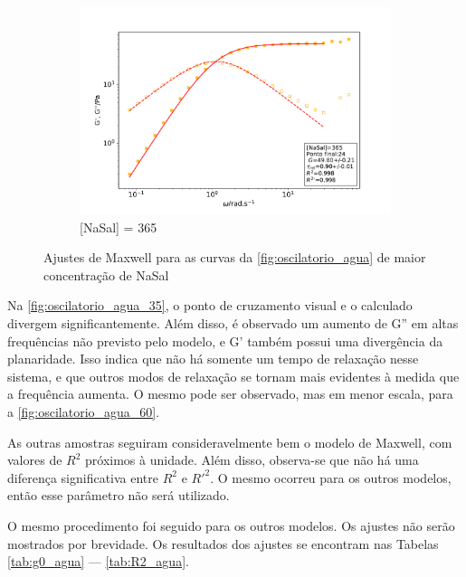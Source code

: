 \begin{figure}[h]
			\begin{subfigure}[t]{0.5\textwidth}
				\includegraphics[width=\textwidth]{imagens/reologia/oscilatorio_agua_365}
				\caption{[NaSal] = 365\mM}
				\label{fig:oscilatorio_agua_365}
			\end{subfigure}
		
			\caption{Ajustes de Maxwell para as curvas da \autoref{fig:oscilatorio_agua} de maior concentração de NaSal}
			\label{fig:oscilatorio_agua_maxwell2}
		\end{figure}
	
		Na \autoref{fig:oscilatorio_agua_35}, o ponto de cruzamento visual e o calculado divergem significantemente. Além disso, é observado um aumento de G'' em altas frequências não previsto pelo modelo, e G' também possui uma divergência da planaridade. Isso indica que não há somente um tempo de relaxação nesse sistema, e que outros modos de relaxação se tornam mais evidentes à medida que a frequência aumenta. O mesmo pode ser observado, mas em menor escala, para a \autoref{fig:oscilatorio_agua_60}. %
		
		As outras amostras seguiram consideravelmente bem o modelo de Maxwell, com valores de \(R^2\) próximos à unidade. Além disso, observa-se que não há uma diferença significativa entre \(R^2\) e \(R\mathrm{'}^2\). O mesmo ocorreu para os outros modelos, então esse parâmetro não será utilizado.
		
		O mesmo procedimento foi seguido para os outros modelos. Os ajustes não serão mostrados por brevidade. Os resultados dos ajustes se encontram nas Tabelas \ref{tab:g0_agua} --- \ref{tab:R2_agua}.
		
